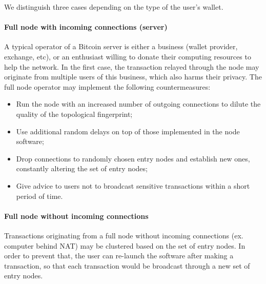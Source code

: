 We distinguish three cases depending on the type of the user's wallet.

\paragraph{Full node with incoming connections (server)}
A typical operator of a Bitcoin server is either a business (wallet provider, exchange, etc), or an enthusiast willing to donate their computing resources to help the network.
In the first case, the transaction relayed through the node may originate from multiple users of this business, which also harms their privacy.
The full node operator may implement the following countermeasures:
\begin{itemize}
	\item Run the node with an increased number of outgoing connections to  dilute the quality of the topological fingerprint;
	\item Use additional random delays on top of those implemented in the node software;
	\item Drop connections to randomly chosen entry nodes and establish new ones, constantly altering the set of entry nodes;
	\item Give advice to users not to broadcast sensitive transactions within a short period of time.
\end{itemize}

\paragraph{Full node without incoming connections}
Transactions originating from a full node without incoming connections (ex. computer behind NAT) may be clustered based on the set of entry nodes.
In order to prevent that, the user can re-launch the software after making a transaction, so that each transaction would be broadcast through a new set of entry nodes.

